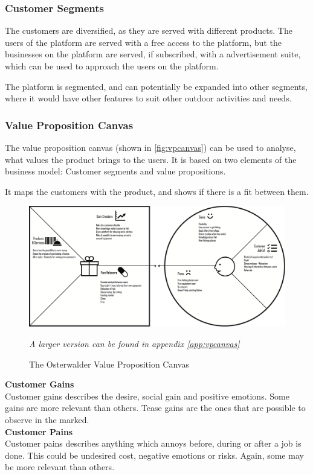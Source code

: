 \subsubsection{Customer Segments}
The customers are diversified, as they are served with different products. The users of the platform are served with a free access to the platform, but the businesses on the platform are served, if subscribed, with a advertisement suite, which can be used to approach the users on the platform.

The platform is segmented, and can potentially be expanded into other segments, where it would have other features to suit other outdoor activities and needs.

\subsubsection{Value Proposition Canvas}
The value proposition canvas (shown in \autoref{fig:vpcanvas}) can be used to analyse, what values the product brings to the users. It is based on two elements of the business model: Customer segments and value propositions.  

It maps the customers with the product, and shows if there is a fit between them.
\begin{figure}[H]
  \centering
  \includegraphics[width=.45\textwidth]{images/value_proposition_canvas.png}
  \caption{The Osterwalder Value Proposition Canvas}
  \label{fig:vpcanvas}
  \footnotesize{\textit{A larger version can be found in appendix \ref{app:vpcanvas}}}
\end{figure}

{\noindent \textbf{Customer Gains\\}}
Customer gains describes the desire, social gain and positive emotions. Some gains are more relevant than others. Tease gains are the ones that are possible to observe in the marked.\\
  
{\noindent \textbf{Customer Pains\\}}
Customer pains describes anything which annoys before, during or after a job is done. This could be undesired cost, negative emotions or risks. Again, some may be more relevant than others. \\

